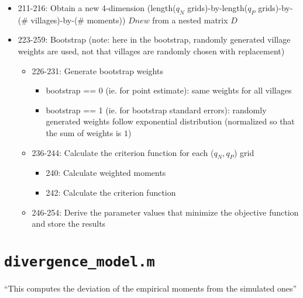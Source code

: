 \documentclass[10pt,letterpaper]{article}
\begin{document}
\begin{itemize}
  \item 211-216: Obtain a new 4-dimension (length($q_N$ grids)-by-length($q_P$ grids)-by-(\# villages)-by-(\# moments))   $Dnew$ from a nested matrix $D$
  \item 223-259: Bootstrap (note: here in the bootstrap, randomly generated village weights are used, not that villages are randomly chosen with replacement)
    \begin{itemize}
      \item 226-231: Generate bootstrap weights 
        \begin{itemize}
          \item bootstrap == 0 (ie. for point estimate): same weights for all villages
          \item bootstrap == 1 (ie. for bootstrap standard errors): randomly generated weights follow exponential distribution (normalized so that the sum of weights is $1$)
        \end{itemize}
      \item 236-244: Calculate the criterion function for each ($q_N, q_P$) grid
        \begin{itemize}
          \item 240: Calculate weighted moments 
          \item 242: Calculate the criterion function
        \end{itemize}
      \item 246-254: Derive the parameter values that minimize the objective function and store the results
    \end{itemize}
\end{itemize}

\section{\texttt{divergence\_model.m}}\label{divergence_model}

``This computes the deviation of the empirical moments from the simulated ones''
\end{document}

